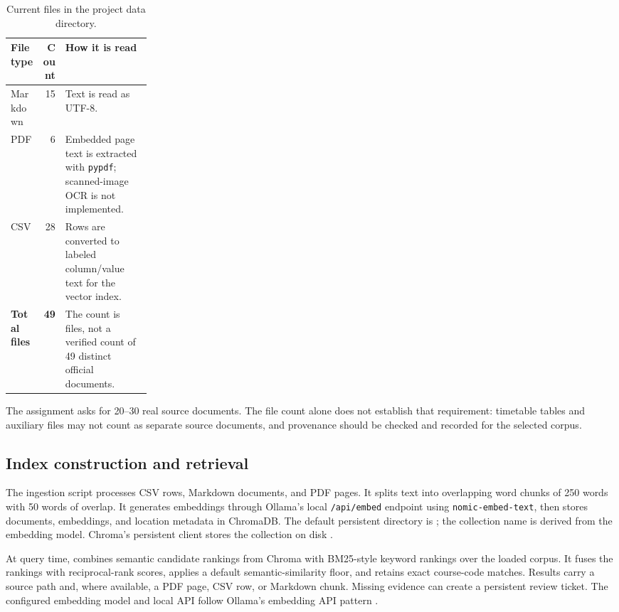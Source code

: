 \documentclass[11pt,a4paper]{article}
\begin{document}
\begin{table}[htbp]
\centering
\small
\begin{tabularx}{0.88\linewidth}{@{}L{0.23\linewidth}rY@{}}
\toprule
\textbf{File type} & \textbf{Count} & \textbf{How it is read}\\
\midrule
Markdown & 15 & Text is read as UTF-8.\\
PDF & 6 & Embedded page text is extracted with \texttt{pypdf}; scanned-image OCR is not implemented.\\
CSV & 28 & Rows are converted to labeled column/value text for the vector index.\\
\midrule
\textbf{Total files} & \textbf{49} & The count is files, not a verified count of 49 distinct official documents.\\
\bottomrule
\end{tabularx}
\caption{Current files in the project data directory.}
\label{tab:data}
\end{table}

The assignment asks for 20--30 real source documents. The file count alone does not establish that requirement: timetable tables and auxiliary files may not count as separate source documents, and provenance should be checked and recorded for the selected corpus.

\subsection{Index construction and retrieval}
The ingestion script  processes CSV rows, Markdown documents, and PDF pages. It splits text into overlapping word chunks of 250 words with 50 words of overlap. It generates embeddings through Ollama's local \texttt{/api/embed} endpoint using \texttt{nomic-embed-text}, then stores documents, embeddings, and location metadata in ChromaDB. The default persistent directory is ; the collection name is derived from the embedding model. Chroma's persistent client stores the collection on disk \cite{chroma}.

At query time,  combines semantic candidate rankings from Chroma with BM25-style keyword rankings over the loaded corpus. It fuses the rankings with reciprocal-rank scores, applies a default semantic-similarity floor, and retains exact course-code matches. Results carry a source path and, where available, a PDF page, CSV row, or Markdown chunk. Missing evidence can create a persistent review ticket. The configured embedding model and local API follow Ollama's embedding API pattern \cite{ollama}.
\end{document}
